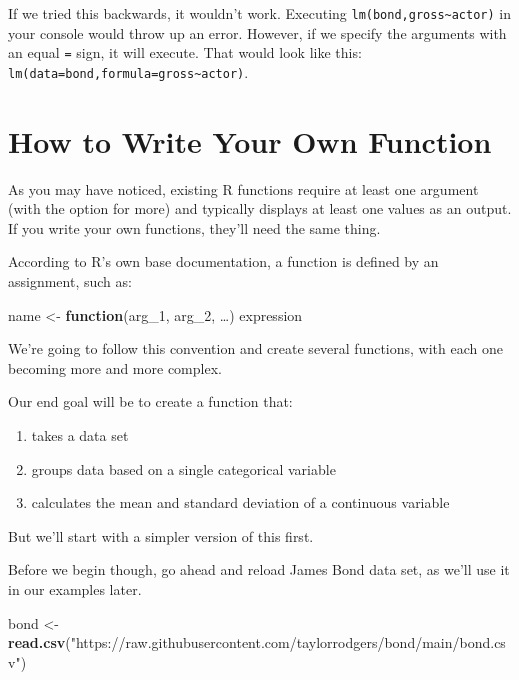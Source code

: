 \documentclass[
]{book}
\newenvironment{Shaded}{\begin{snugshade}}{\end{snugshade}}
\newcommand{\ControlFlowTok}[1]{\textcolor[rgb]{0.13,0.29,0.53}{\textbf{#1}}}
\newcommand{\DecValTok}[1]{\textcolor[rgb]{0.00,0.00,0.81}{#1}}
\newcommand{\KeywordTok}[1]{\textcolor[rgb]{0.13,0.29,0.53}{\textbf{#1}}}
\newcommand{\NormalTok}[1]{#1}
\newcommand{\StringTok}[1]{\textcolor[rgb]{0.31,0.60,0.02}{#1}}
\providecommand{\tightlist}{%
  \setlength{\itemsep}{0pt}\setlength{\parskip}{0pt}}
\begin{document}
\begin{center}
If we tried this backwards, it wouldn't work. Executing \texttt{lm(bond,gross\textasciitilde{}actor)} in your console would throw up an error. However, if we specify the arguments with an equal \texttt{=} sign, it will execute. That would look like this: \texttt{lm(data=bond,formula=gross\textasciitilde{}actor)}.

\hypertarget{how-to-write-your-own-function}{%
\section{How to Write Your Own Function}\label{how-to-write-your-own-function}}

As you may have noticed, existing R functions require at least one argument (with the option for more) and typically displays at least one values as an output. If you write your own functions, they'll need the same thing.

According to R's own base documentation, a function is defined by an assignment, such as:

\begin{Shaded}
\begin{Highlighting}[]
\NormalTok{name <-}\StringTok{ }\ControlFlowTok{function}\NormalTok{(arg_}\DecValTok{1}\NormalTok{, arg_}\DecValTok{2}\NormalTok{, …) expression}
\end{Highlighting}
\end{Shaded}

We're going to follow this convention and create several functions, with each one becoming more and more complex.

Our end goal will be to create a function that:

\begin{enumerate}
\def\labelenumi{\arabic{enumi}.}
\tightlist
\item
  takes a data set
\item
  groups data based on a single categorical variable
\item
  calculates the mean and standard deviation of a continuous variable
\end{enumerate}

But we'll start with a simpler version of this first.

Before we begin though, go ahead and reload James Bond data set, as we'll use it in our examples later.

\begin{Shaded}
\begin{Highlighting}[]
\NormalTok{bond <-}\StringTok{ }\KeywordTok{read.csv}\NormalTok{(}\StringTok{"https://raw.githubusercontent.com/taylorrodgers/bond/main/bond.csv"}\NormalTok{)}
\end{Highlighting}
\end{Shaded}


\end{center}
\end{document}
